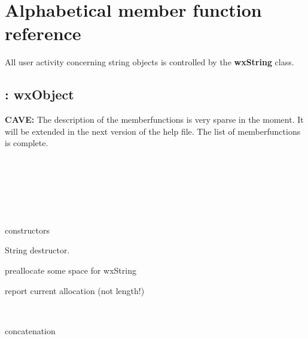  
\chapter{Alphabetical member function reference}
%
\setfooter{\thepage}{}{}{}{}{\thepage}

All user activity concerning string objects
is controlled by the {\bf wxString} class.

\section{: wxObject}
{\bf CAVE:} The description of the memberfunctions is very
sparse in the moment. It will be extended in the next
version of the help file. The list of memberfunctions
is complete.

\label{wxstringconstruct}
\\
\\
\\
\\
\\

constructors

\label{wxstringdestruct}

String destructor.

\label{wxstringAlloc}

preallocate some space for wxString

\label{wxstringAllocation}
 

report current allocation (not length!)

\label{wxstringAppend}
\\

concatenation


